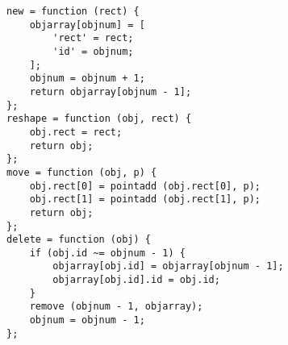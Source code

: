 \begin{verbatim}
new = function (rect) {
    objarray[objnum] = [
        'rect' = rect;
        'id' = objnum;
    ];
    objnum = objnum + 1;
    return objarray[objnum - 1];
};
reshape = function (obj, rect) {
    obj.rect = rect;
    return obj;
};
move = function (obj, p) {
    obj.rect[0] = pointadd (obj.rect[0], p);
    obj.rect[1] = pointadd (obj.rect[1], p);
    return obj;
};
delete = function (obj) {
    if (obj.id ~= objnum - 1) {
        objarray[obj.id] = objarray[objnum - 1];
        objarray[obj.id].id = obj.id;
    }
    remove (objnum - 1, objarray);
    objnum = objnum - 1;
};
\end{verbatim}
